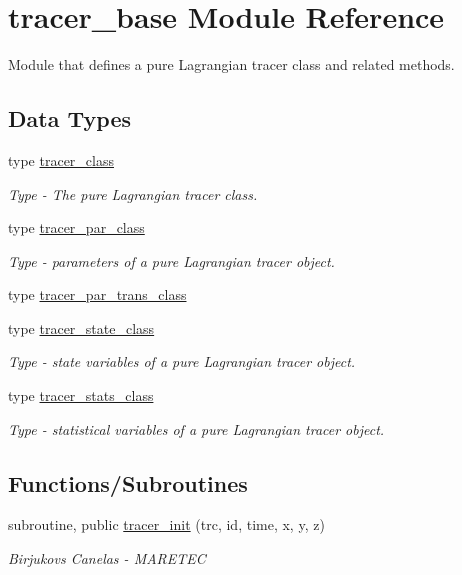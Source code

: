 \hypertarget{namespacetracer__base}{}\section{tracer\+\_\+base Module Reference}
\label{namespacetracer__base}


Module that defines a pure Lagrangian tracer class and related methods.  


\subsection*{Data Types}
\begin{DoxyCompactItemize}
\item 
type \mbox{\hyperlink{structtracer__base_1_1tracer__class}{tracer\+\_\+class}}
\begin{DoxyCompactList}\small\item\em Type -\/ The pure Lagrangian tracer class. \end{DoxyCompactList}\item 
type \mbox{\hyperlink{structtracer__base_1_1tracer__par__class}{tracer\+\_\+par\+\_\+class}}
\begin{DoxyCompactList}\small\item\em Type -\/ parameters of a pure Lagrangian tracer object. \end{DoxyCompactList}\item 
type \mbox{\hyperlink{structtracer__base_1_1tracer__par__trans__class}{tracer\+\_\+par\+\_\+trans\+\_\+class}}
\item 
type \mbox{\hyperlink{structtracer__base_1_1tracer__state__class}{tracer\+\_\+state\+\_\+class}}
\begin{DoxyCompactList}\small\item\em Type -\/ state variables of a pure Lagrangian tracer object. \end{DoxyCompactList}\item 
type \mbox{\hyperlink{structtracer__base_1_1tracer__stats__class}{tracer\+\_\+stats\+\_\+class}}
\begin{DoxyCompactList}\small\item\em Type -\/ statistical variables of a pure Lagrangian tracer object. \end{DoxyCompactList}\end{DoxyCompactItemize}
\subsection*{Functions/\+Subroutines}
\begin{DoxyCompactItemize}
\item 
subroutine, public \mbox{\hyperlink{namespacetracer__base_ac4eda3326a346308d0a7fb42b4af9cb9}{tracer\+\_\+init}} (trc, id, time, x, y, z)
\begin{DoxyCompactList}\small\item\em Birjukovs Canelas -\/ M\+A\+R\+E\+T\+EC \end{DoxyCompactList}\end{DoxyCompactItemize}


